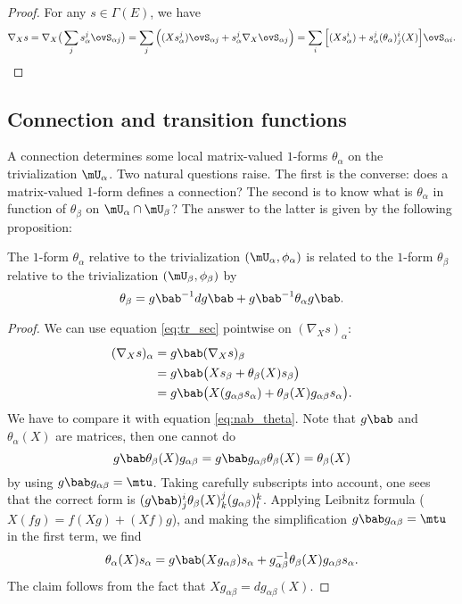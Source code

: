 \begin{proof}
For any $s\in\Gamma(E)$, we have
\begin{equation}
\nabla_Xs=\nabla_X\big(  \sum_j s^j_{\alpha}\ovS_{\alpha j}  \big)
         =\sum_j\Big(  (Xs_{\alpha}^j)\ovS_{\alpha j} + s^j_{\alpha}\nabla_X\ovS_{\alpha j}     \Big)
	 =\sum_i\Big[   (Xs_{\alpha}^i)+s_{\alpha}^j(\theta_{\alpha})_j^i(X)  \Big]\ovS_{\alpha i}.
\end{equation}
\end{proof}

\subsection{Connection and transition functions}

A connection determines some local matrix-valued $1$-forms $\theta_{\alpha}$ on the trivialization $\mU_{\alpha}$. Two natural questions raise. The first is the converse: does a matrix-valued $1$-form defines a connection? The second is to know  what is $\theta_{\alpha}$ in function of $\theta_{\beta}$ on $\mU_{\alpha}\cap\mU_{\beta}$? The answer to the latter is  given by the following proposition:

\begin{proposition}
The $1$-form $\theta_{\alpha}$ relative to the trivialization $(\mU_{\alpha},\phi_{\alpha})$ is related to the $1$-form $\theta_{\beta}$ relative to the trivialization $(\mU_{\beta},\phi_{\beta})$ by
\begin{equation}\label{eq:theta_g}
  \theta_{\beta}=g\bab^{-1} dg\bab+g\bab^{-1}\theta_{\alpha} g\bab.
\end{equation}
\end{proposition}

\begin{proof}
We can use equation \eqref{eq:tr_sec} pointwise on $(\nabla_X s)_{\alpha}$:
\begin{equation}
\begin{split}
(\nabla_X s)_{\alpha}&=g\bab(\nabla_Xs)_{\beta}\\
                  &=g\bab\big(   Xs_{\beta}+\theta_{\beta}(X)s_{\beta}   \big) \\
                  &=g\bab\big(   X(g_{\alpha\beta} s_{\alpha})+\theta_{\beta}(X)g_{\alpha\beta} s_{\alpha}   \big).
\end{split}
\end{equation}
We have to compare it with equation \eqref{eq:nab_theta}. Note that $g\bab$ and $\theta_{\alpha}(X)$ are matrices, then one cannot do
\[
   g\bab\theta_{\beta}(X)g_{\alpha\beta} =g\bab g_{\alpha\beta}\theta_{\beta}(X)=\theta_{\beta}(X)
\]
by using $g\bab g_{\alpha\beta}=\mtu$.  Taking carefully subscripts into account, one sees that the correct form is $(g\bab)^i_j\theta_{\beta}(X)^j_k(g_{\alpha\beta})^k_l$. Applying Leibnitz formula ($X(fg)=f(Xg)+(Xf)g$), and making the simplification $g\bab g_{\alpha\beta}=\mtu$ in the first term, we find
\[
  \theta_{\alpha}(X)s_{\alpha}=g\bab(Xg_{\alpha\beta})s_{\alpha}+g_{\alpha\beta}^{-1}\theta_{\beta}(X)g_{\alpha\beta} s_{\alpha}.
\]
The claim follows from the fact that $Xg_{\alpha\beta}=dg_{\alpha\beta}(X)$.
\end{proof}


